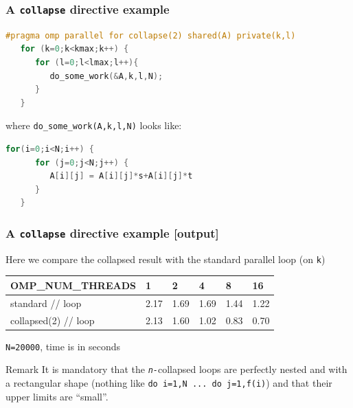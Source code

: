 \begin{frame}[containsverbatim]
\frametitle{A \texttt{collapse} directive example}

\begin{lstlisting}[language=C,frame=lines]
#pragma omp parallel for collapse(2) shared(A) private(k,l)
   for (k=0;k<kmax;k++) {
      for (l=0;l<lmax;l++){
         do_some_work(&A,k,l,N);
      }
   }
\end{lstlisting}
where \texttt{do\_some\_work(A,k,l,N)} looks like:
\begin{lstlisting}[language=C,frame=lines]
   for(i=0;i<N;i++) {
      for (j=0;j<N;j++) {
         A[i][j] = A[i][j]*s+A[i][j]*t
      }
   }
\end{lstlisting}
\end{frame}

\begin{frame}[containsverbatim]
\frametitle{A \texttt{collapse} directive example [output]}
\begin{block}{}
Here we compare the collapsed result with the standard parallel loop (on \texttt{k})
\end{block}

\begin{tabular}{|l|l|l|l|l|l|}
\hline
 \textbf{OMP\_NUM\_THREADS} & \textbf{1} & \textbf{2} & \textbf{4} & \textbf{8} & \textbf{16}\\
\hline
\hline
standard // loop &2.17 &1.69 &1.69 &1.44 &1.22 \\
\hline
collapsed(2) // loop &2.13 &1.60 &1.02 &0.83 &0.70 \\
\hline
\end{tabular}

\texttt{N=20000}, time is in seconds

\begin{block}{Remark}
It is mandatory that the \textit{\texttt{n-}}collapsed loops are perfectly nested and with a rectangular shape (nothing like \texttt{do i=1,N ... do j=1,f(i)}) and that their upper limits are ``small''.
\end{block}



\end{frame}




